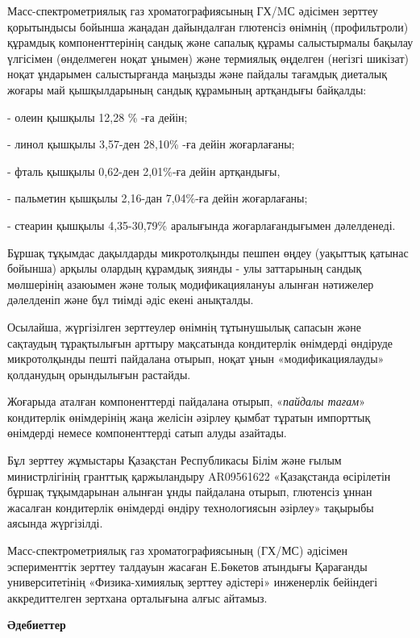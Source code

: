 \begin{multicols}{2}
Масс-спектрометриялық газ хроматографиясының ГХ/MС әдісімен зерттеу
қорытындысы бойынша жаңадан дайындалған глютенсіз өнімнің (профильтроли)
құрамдық компоненттерінің сандық және сапалық құрамы салыстырмалы
бақылау үлгісімен (өнделмеген ноқат ұнымен) және термиялық өңделген
(негізгі шикізат) ноқат ұндарымен салыстырғанда маңызды және пайдалы
тағамдық диеталық жоғары май қышқылдарының сандық құрамының артқандығы
байқалды:

- олеин қышқылы 12,28 \% -ға дейін;

- линол қышқылы 3,57-ден 28,10\% -ға дейін жоғарлағаны;

- фталь қышқылы 0,62-ден 2,01\%-ға дейін артқандығы,

- пальметин қышқылы 2,16-дан 7,04\%-ға дейін жоғарлағаны;

- стеарин қышқылы 4,35-30,79\% аралығында жоғарлағандығымен дәлелденеді.

Бұршақ тұқымдас дақылдарды микротолқынды пешпен өңдеу (уақыттық қатынас
бойынша) арқылы олардың құрамдық зиянды - улы заттарының сандық
мөлшерінің азаюымен және толық модификациялануы алынған нәтижелер
дәлелденіп және бұл тиімді әдіс екені анықталды.

Осылайша, жүргізілген зерттеулер өнімнің тұтынушылық сапасын және
сақтаудың тұрақтылығын арттыру мақсатында кондитерлік өнімдерді өндіруде
микротолқынды пешті пайдалана отырып, ноқат ұнын «модификациялауды»
қолданудың орындылығын растайды.

Жоғарыда аталған компоненттерді пайдалана отырып, «\emph{пайдалы тағам}»
кондитерлік өнімдерінің жаңа желісін әзірлеу қымбат тұратын импорттық
өнімдерді немесе компоненттерді сатып алуды азайтады.

Бұл зерттеу жұмыстары Қазақстан Республикасы Білім және ғылым
министрлігінің гранттық қаржыландыру AR09561622 «Қазақстанда өсірілетін
бұршақ тұқымдарынан алынған ұнды пайдалана отырып, глютенсіз ұннан
жасалған кондитерлік өнімдерді өндіру технологиясын әзірлеу» тақырыбы
аясында жүргізілді.

Масс-спектрометриялық газ хроматографиясының (ГХ/МС) әдісімен
эсперименттік зерттеу талдауын жасаған Е.Бөкетов атындығы Қарағанды
университетінің «Физика-химиялық зерттеу әдістері» инженерлік бейіндегі
аккредиттелген зертхана орталығына алғыс айтамыз.
\end{multicols}

\begin{center}
	{\bfseries Әдебиеттер}
	\end{center}
	
